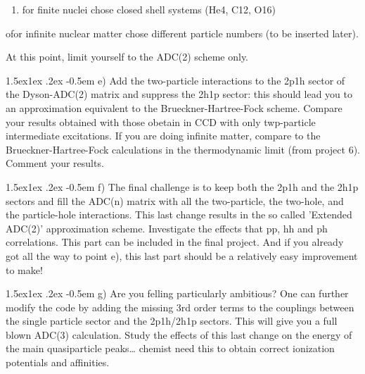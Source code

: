 \documentclass[%
twoside,                 %
final,                   %
10pt]{article}
\makeatletter
\newenvironment{doconceexercise}{}{}
\newcommand\subex{\@startsection{paragraph}{4}{\z@}%
                  {1.5ex\@plus1ex \@minus.2ex}%
                  {-0.5em}%
                  {\normalfont\normalsize\bfseries}}
\makeatother
\begin{document}
\begin{doconceexercise}
\begin{enumerate}
 \item for finite nuclei chose closed shell systems (He4, C12, O16)  
\end{enumerate}

\noindent
  ofor infinite nuclear matter chose different particle numbers (to be inserted later). 

At this point, limit yourself to the ADC(2) scheme only.

\subex{e)}
Add the two-particle interactions to the 2p1h sector of the Dyson-ADC(2) matrix and suppress the 2h1p sector: this
should lead you to an approximation equivalent to the Brueckner-Hartree-Fock scheme. Compare your results obtained with
those obetain in CCD with only twp-particle intermediate excitations. If you are doing infinite matter, compare to the  Brueckner-Hartree-Fock calculations in the thermodynamic limit (from project 6). Comment your results.

\subex{f)}
The final challenge is to keep both the 2p1h and the 2h1p sectors and fill the ADC(n) matrix with all the two-particle, the two-hole, and the particle-hole interactions.  This last change results in the so called 'Extended ADC(2)' approximation scheme. Investigate the effects that pp, hh and ph correlations. 
This part can be included in the final project. And if you already got all the way to point e), this last part should be a relatively easy improvement to make!

\subex{g)}
Are you felling particularly ambitious? One can further modify the code by adding the missing 3rd order terms to the couplings between the single particle sector and the 2p1h/2h1p sectors. This will give you a full blown ADC(3) calculation. Study the effects of this last change on the energy of the main quasiparticle peaks…  chemist need this to obtain correct ionization potentials and affinities.

\end{doconceexercise}
\end{document}
